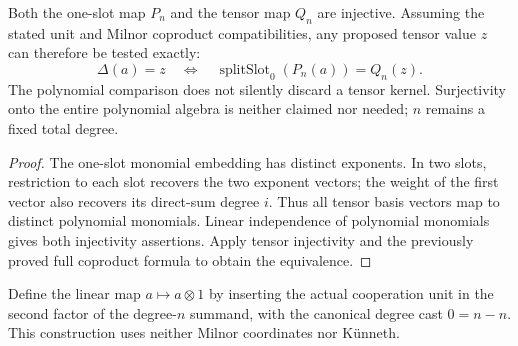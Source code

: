 \begin{proposition}
  \label{prop:h6-milnor-polynomial-faithful}
  \leanok
  Both the one-slot map $P_n$ and the tensor map $Q_n$ are injective.
  Assuming the stated unit and Milnor coproduct compatibilities, any
  proposed tensor value $z$ can therefore be tested exactly:
  \[
    \Delta(a)=z\quad\Longleftrightarrow\quad
    \operatorname{splitSlot}_0(P_n(a))=Q_n(z).
  \]
  The polynomial comparison does not silently discard a tensor kernel.
  Surjectivity onto the entire polynomial algebra is neither claimed nor
  needed; $n$ remains a fixed total degree.
\end{proposition}
\begin{proof}
  The one-slot monomial embedding has distinct exponents. In two slots,
  restriction to each slot recovers the two exponent vectors; the weight
  of the first vector also recovers its direct-sum degree $i$.
  Thus all tensor basis vectors map to distinct polynomial monomials.
  Linear independence of polynomial monomials gives both injectivity
  assertions. Apply tensor injectivity and the previously proved full
  coproduct formula to obtain the equivalence.
  \leanok
\end{proof}

\begin{definition}
  \label{def:h6-right-unit-tensor}
  \leanok
  Define the linear map $a\mapsto a\otimes1$ by inserting the actual
  cooperation unit in the second factor of the degree-$n$ summand, with
  the canonical degree cast $0=n-n$. This construction uses neither
  Milnor coordinates nor K\"unneth.
\end{definition}

